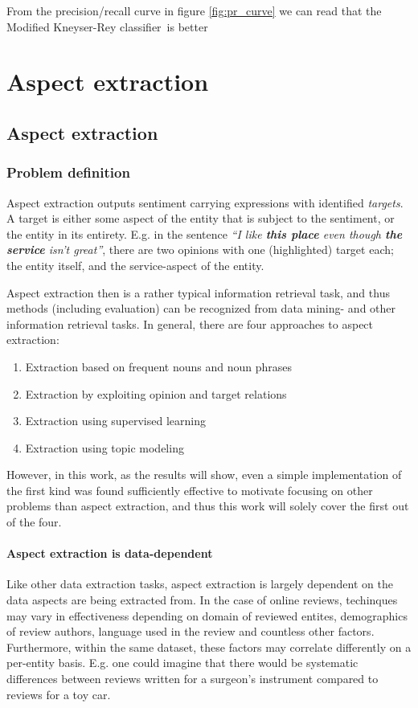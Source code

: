 \documentclass[a4paper,11pt]{kth-mag}
\newcommand{\yelpSentClassifier}{Modified Kneyser-Rey classifier}
\begin{document}
From the precision/recall curve in figure \ref{fig:pr_curve} we can read that the \yelpSentClassifier~is better


\part{Aspect extraction}
\chapter{Aspect extraction}

\section{Problem definition}
Aspect extraction outputs sentiment carrying expressions with identified \emph{targets}. A target is either some aspect of the entity that is subject to the sentiment, or the entity in its entirety. E.g. in the sentence \emph{``I like \textbf{this place} even though \textbf{the service} isn't great''},  there are two opinions with one (highlighted) target each; the entity itself, and the service-aspect of the entity.

Aspect extraction then is a rather typical information retrieval task, and thus methods (including evaluation) can be recognized from data mining- and other information retrieval tasks. In general, there are four approaches to aspect extraction\cite[chapter 5.3]{liu2012sentiment}:

\begin{enumerate}
\item Extraction based on frequent nouns and noun phrases
\item Extraction by exploiting opinion and target relations
\item Extraction using supervised learning
\item Extraction using topic modeling
\end{enumerate}
However, in this work, as the results will show, even a simple implementation of the first kind was found sufficiently effective to motivate focusing on other problems than aspect extraction, and thus this work will solely cover the first out of the four.

\subsection{Aspect extraction is data-dependent}
Like other data extraction tasks, aspect extraction is largely dependent on the data aspects are being extracted from.
In the case of online reviews, techinques may vary in effectiveness depending on domain of reviewed entites, demographics of review authors, language used in the review and countless other factors. Furthermore, within the same dataset, these factors may correlate differently on a per-entity basis. E.g. one could imagine that there would be systematic differences between reviews written for a surgeon's instrument compared to reviews for a toy car.
\end{document}

